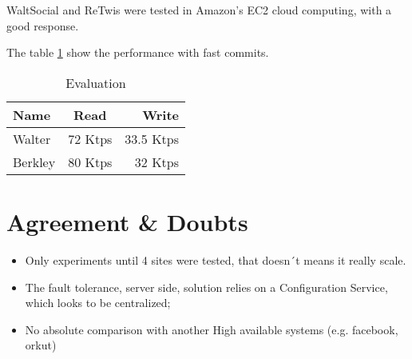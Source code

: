 \documentclass[a4paper]{article}
\begin{document}
WaltSocial and ReTwis were tested in Amazon's EC2 cloud computing, with a good response.

The table \ref{tab-evaluation} show the performance with fast commits.

\begin{table}[center]
\begin{tabular}{ l c r }
	\hline
   Name & Read & Write \\
   \hline
   Walter & 72 Ktps & 33.5 Ktps \\
   Berkley & 80 Ktps & 32 Ktps \\
 \end{tabular}
 \caption{\label{tab-evaluation} Evaluation}
 \end{table}


\section{Agreement \& Doubts}

\begin{itemize}
\item Only experiments until 4 sites were tested, that doesn´t means it really scale.
\item The fault tolerance, server side, solution relies on a Configuration Service, which looks to be centralized;
\item No absolute comparison with another High available systems (e.g. facebook, orkut)
\end{itemize}
\end{document}
